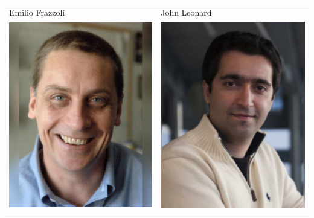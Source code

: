 \documentclass[landscape,a0paper,fontscale=0.292]{baposter}
\begin{document}
\begin{poster}
{\begin{center}
\begin{tabularx}{\linewidth}{X X}
{\tiny \centering Emilio Frazzoli }& {\tiny \centering John Leonard }\\ 
 {\centering \includegraphics[width=0.85\linewidth]{how.jpg}}&
{\centering \includegraphics[width=0.85\linewidth]{karaman.jpg}}\\ 


\end{tabularx}
\end{center}}
\end{poster}
\end{document}
